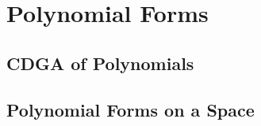
\section{Polynomial Forms}
\label{sec:cdga-of-polynomials}

\subsection{CDGA of Polynomials}


\subsection{Polynomial Forms on a Space}
\label{sec:polynomial-forms}

